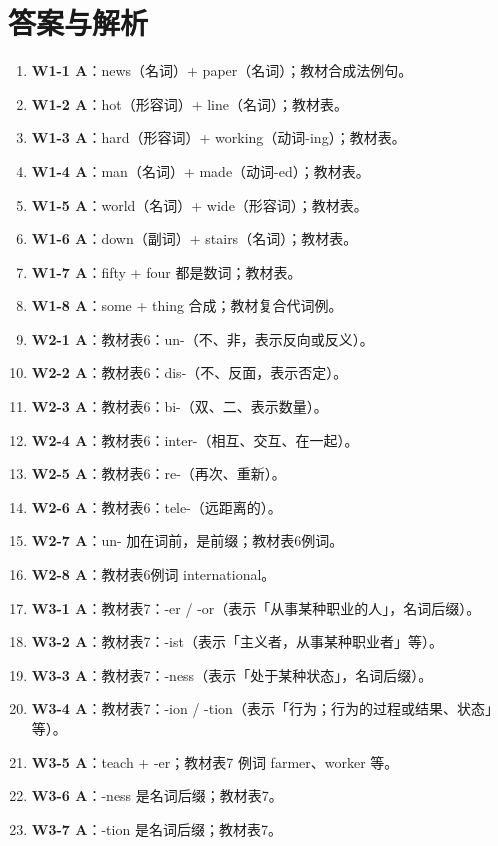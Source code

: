 \documentclass[11pt,a4paper]{ctexart}
\begin{document}
\section*{答案与解析}
\small
\begin{enumerate}[leftmargin=1.6em,itemsep=2pt]
\item \textbf{W1-1 A}：news（名词）+ paper（名词）；教材合成法例句。
\item \textbf{W1-2 A}：hot（形容词）+ line（名词）；教材表。
\item \textbf{W1-3 A}：hard（形容词）+ working（动词-ing）；教材表。
\item \textbf{W1-4 A}：man（名词）+ made（动词-ed）；教材表。
\item \textbf{W1-5 A}：world（名词）+ wide（形容词）；教材表。
\item \textbf{W1-6 A}：down（副词）+ stairs（名词）；教材表。
\item \textbf{W1-7 A}：fifty + four 都是数词；教材表。
\item \textbf{W1-8 A}：some + thing 合成；教材复合代词例。
\item \textbf{W2-1 A}：教材表6：un-（不、非，表示反向或反义）。
\item \textbf{W2-2 A}：教材表6：dis-（不、反面，表示否定）。
\item \textbf{W2-3 A}：教材表6：bi-（双、二、表示数量）。
\item \textbf{W2-4 A}：教材表6：inter-（相互、交互、在一起）。
\item \textbf{W2-5 A}：教材表6：re-（再次、重新）。
\item \textbf{W2-6 A}：教材表6：tele-（远距离的）。
\item \textbf{W2-7 A}：un- 加在词前，是前缀；教材表6例词。
\item \textbf{W2-8 A}：教材表6例词 international。
\item \textbf{W3-1 A}：教材表7：-er / -or（表示「从事某种职业的人」，名词后缀）。
\item \textbf{W3-2 A}：教材表7：-ist（表示「主义者，从事某种职业者」等）。
\item \textbf{W3-3 A}：教材表7：-ness（表示「处于某种状态」，名词后缀）。
\item \textbf{W3-4 A}：教材表7：-ion / -tion（表示「行为；行为的过程或结果、状态」等）。
\item \textbf{W3-5 A}：teach + -er；教材表7 例词 farmer、worker 等。
\item \textbf{W3-6 A}：-ness 是名词后缀；教材表7。
\item \textbf{W3-7 A}：-tion 是名词后缀；教材表7。

\end{enumerate}
\end{document}
